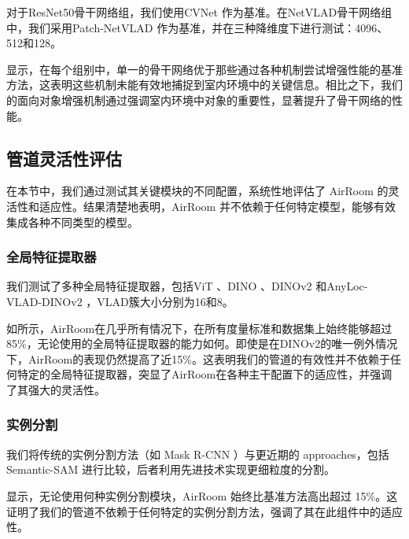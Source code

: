 对于ResNet50骨干网络组，我们使用CVNet \cite{lee2022correlationverificationimageretrieval} 作为基准。在NetVLAD骨干网络组中，我们采用Patch-NetVLAD \cite{hausler2021patchnetvladmultiscalefusionlocallyglobal} 作为基准，并在三种降维度下进行测试：4096、512和128。

显示，在每个组别中，单一的骨干网络优于那些通过各种机制尝试增强性能的基准方法，这表明这些机制未能有效地捕捉到室内环境中的关键信息。相比之下，我们的面向对象增强机制通过强调室内环境中\mbox{对象}的重要性，显著提升了骨干网络的性能。
\subsection{管道灵活性评估}  
\label{sec:section4.6}  
\vspace{-3pt}  
在本节中，我们通过测试其关键模块的不同配置，系统性地评估了 AirRoom 的灵活性和适应性。结果清楚地表明，AirRoom 并不依赖于任何特定模型，能够有效集成各种不同类型的模型。  

\vspace{-5pt}
\subsubsection{全局特征提取器}
\vspace{-4pt}
我们测试了多种全局特征提取器，包括ViT \cite{dosovitskiy2021imageworth16x16words}、DINO \cite{caron2021emergingpropertiesselfsupervisedvision}、DINOv2 \cite{oquab2024dinov2learningrobustvisual} 和AnyLoc-VLAD-DINOv2 \cite{keetha2023anylocuniversalvisualplace}，VLAD簇大小分别为16和8。

如所示，AirRoom在几乎所有情况下，在所有度量标准和数据集上始终能够超过85\%，无论使用的全局特征提取器的能力如何。即使是在DINOv2的唯一例外情况下，AirRoom的表现仍然提高了近15\%。这表明我们的管道的有效性并不依赖于任何特定的全局特征提取器，突显了AirRoom在各种主干配置下的适应性，并强调了其强大的灵活性。

\vspace{-5pt}
\subsubsection{实例分割}
\vspace{-4pt}
我们将传统的实例分割方法（如 Mask R-CNN \cite{he2018maskrcnn}）与更近期的 approaches，包括 Semantic-SAM \cite{li2023semanticsamsegmentrecognizegranularity} 进行比较，后者利用先进技术实现更细粒度的分割。

 显示，无论使用何种实例分割模块，AirRoom 始终比基准方法高出超过 15\%。这证明了我们的管道不依赖于任何特定的实例分割方法，强调了其在此组件中的适应性。

